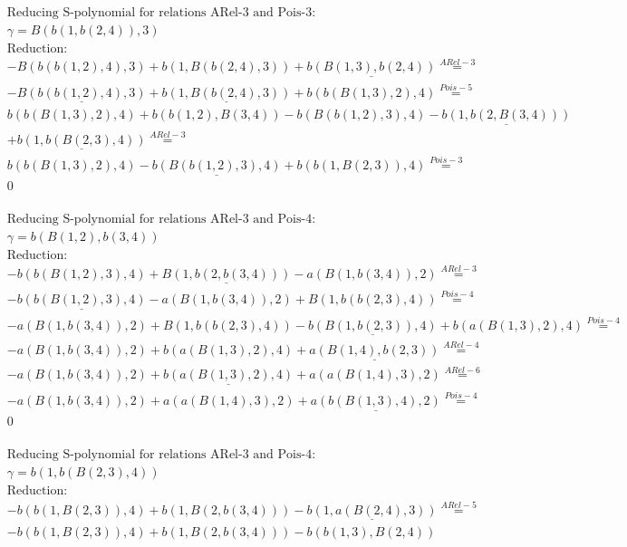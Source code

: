 \documentclass[11pt]{amsart}
\begin{document}
\begin{align*} 
& \text{Reducing S-polynomial for relations ARel-3 and Pois-3:} \\ 
& \gamma = B(b(1,b(2,4)),3) \\ 
& \text{Reduction}: \\& - B(b(b(1,2),4),3) + b(1,B(b(2,4),3)) + \underline{b(B(1,3),b(2,4))} \stackrel{ ARel-3 }{=}  \\ 
& - \underline{B(b(b(1,2),4),3)} + \underline{b(1,B(b(2,4),3))} + b(b(B(1,3),2),4) \stackrel{ Pois-5 }{=}  \\ 
&b(b(B(1,3),2),4) + b(b(1,2),B(3,4)) - b(B(b(1,2),3),4) - \underline{b(1,b(2,B(3,4)))}\\ 
 &  + \underline{b(1,b(B(2,3),4))} \stackrel{ ARel-3 }{=}  \\ 
&b(b(B(1,3),2),4) - \underline{b(B(b(1,2),3),4)} + b(b(1,B(2,3)),4) \stackrel{ Pois-3 }{=}  \\ 
&0\\ 
\end{align*} 
 
\begin{align*} 
& \text{Reducing S-polynomial for relations ARel-3 and Pois-4:} \\ 
& \gamma = b(B(1,2),b(3,4)) \\ 
& \text{Reduction}: \\& - b(b(B(1,2),3),4) + \underline{B(1,b(2,b(3,4)))} - a(B(1,b(3,4)),2) \stackrel{ ARel-3 }{=}  \\ 
& - \underline{b(b(B(1,2),3),4)} - a(B(1,b(3,4)),2) + B(1,b(b(2,3),4)) \stackrel{ Pois-4 }{=}  \\ 
& - a(B(1,b(3,4)),2) + B(1,b(b(2,3),4)) - \underline{b(B(1,b(2,3)),4)} + b(a(B(1,3),2),4) \stackrel{ Pois-4 }{=}  \\ 
& - a(B(1,b(3,4)),2) + b(a(B(1,3),2),4) + \underline{a(B(1,4),b(2,3))} \stackrel{ ARel-4 }{=}  \\ 
& - a(B(1,b(3,4)),2) + \underline{b(a(B(1,3),2),4)} + a(a(B(1,4),3),2) \stackrel{ ARel-6 }{=}  \\ 
& - a(B(1,b(3,4)),2) + a(a(B(1,4),3),2) + \underline{a(b(B(1,3),4),2)} \stackrel{ Pois-4 }{=}  \\ 
&0\\ 
\end{align*} 
 
\begin{align*} 
& \text{Reducing S-polynomial for relations ARel-3 and Pois-4:} \\ 
& \gamma = b(1,b(B(2,3),4)) \\ 
& \text{Reduction}: \\& - b(b(1,B(2,3)),4) + b(1,B(2,b(3,4))) - \underline{b(1,a(B(2,4),3))} \stackrel{ ARel-5 }{=}  \\ 
& - b(b(1,B(2,3)),4) + b(1,B(2,b(3,4))) - b(b(1,3),B(2,4))\\ 
\end{align*} 
 
\end{document}
